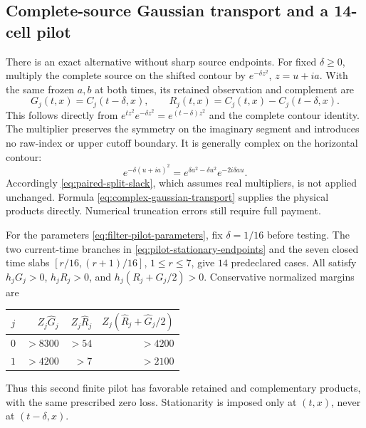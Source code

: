 \documentclass[11pt]{article}
\numberwithin{equation}{section}
\theoremstyle{definition}
\theoremstyle{remark}
\begin{document}
\subsection{Complete-source Gaussian transport and a 14-cell pilot}

There is an exact alternative without sharp source endpoints. For
fixed $\delta\ge0$, multiply the complete source on the shifted
contour by $e^{-\delta z^2}$, $z=u+ia$. With the same frozen $a,b$
at both times, its retained observation and complement are
\begin{equation}
 G_j(t,x)=C_j(t-\delta,x),\qquad
 R_j(t,x)=C_j(t,x)-C_j(t-\delta,x).
 \label{eq:complex-gaussian-transport}
\end{equation}
This follows directly from $e^{tz^2}e^{-\delta z^2}=e^{(t-\delta)z^2}$
and the complete contour identity. The multiplier preserves the
symmetry on the imaginary segment and introduces no raw-index or upper
cutoff boundary. It is generally complex on the horizontal contour:
\[
 e^{-\delta(u+ia)^2}
     =e^{\delta a^2-\delta u^2}e^{-2i\delta au}.
\]
Accordingly \eqref{eq:paired-split-slack}, which assumes real
multipliers, is not applied unchanged. Formula
\eqref{eq:complex-gaussian-transport} supplies the physical products
directly. Numerical truncation errors still require full payment.

For the parameters \eqref{eq:filter-pilot-parameters}, fix
$\delta=1/16$ before testing. The two current-time branches in
\eqref{eq:pilot-stationary-endpoints} and the seven closed time slabs
$[r/16,(r+1)/16]$, $1\le r\le7$, give $14$ predeclared cases.
All satisfy $h_jG_j>0$, $h_jR_j>0$, and
$h_j(R_j+G_j/2)>0$. Conservative normalized margins are
\begin{center}
\begin{tabular}{@{}crrr@{}}
\toprule
$j$ & $Z_j\widehat G_j$ & $Z_j\widehat R_j$
    & $Z_j(\widehat R_j+\widehat G_j/2)$\\
\midrule
$0$ & $>8300$ & $>54$ & $>4200$\\
$1$ & $>4200$ & $>7$ & $>2100$\\
\bottomrule
\end{tabular}
\end{center}
Thus this second finite pilot has favorable retained and complementary
products, with the same prescribed zero loss. Stationarity is imposed
only at $(t,x)$, never at $(t-\delta,x)$.
\end{document}
